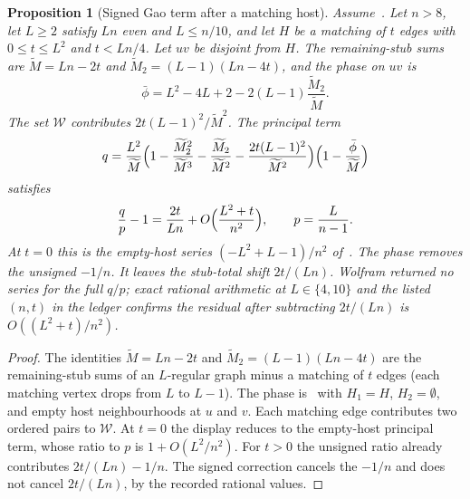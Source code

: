 \documentclass[11pt]{article}
\newtheorem{proposition}[theorem]{Proposition}
\begin{document}
\begin{proposition}[Signed Gao term after a matching host]
\label{prop:signed-matching-host}
Assume~\cite[Theorem~6]{Gao20}. Let \(n>8\), let \(L\ge 2\) satisfy
\(Ln\) even and \(L\le n/10\), and let \(H\) be a matching of \(t\) edges
with \(0\le t\le L^2\) and \(t<Ln/4\).
Let \(uv\) be disjoint from \(H\).
The remaining-stub sums are \(\widetilde M=Ln-2t\) and
\(\widetilde M_2=(L-1)(Ln-4t)\), and the phase on \(uv\) is
\[
\bar\phi=L^2-4L+2-2(L-1)\frac{\widetilde M_2}{\widetilde M}.
\]
The set \(\mathcal W\) contributes \(2t(L-1)^2/\widetilde M^2\).
The principal term
\[
q
=
\frac{L^2}{\widetilde M}
\Bigl(1-\frac{\widetilde M_2^2}{\widetilde M^3}-\frac{\widetilde M_2}{\widetilde M^2}-\frac{2t(L-1)^2}{\widetilde M^2}\Bigr)
\Bigl(1-\frac{\bar\phi}{\widetilde M}\Bigr)
\]
satisfies
\[
\frac{q}{p}-1
=
\frac{2t}{Ln}+O\Bigl(\frac{L^2+t}{n^2}\Bigr),
\qquad
p=\frac{L}{n-1}.
\]
At \(t=0\) this is the empty-host series \((-L^2+L-1)/n^2\) of~\cite{PlusOneV1}.
The phase removes the unsigned \(-1/n\).
It leaves the stub-total shift \(2t/(Ln)\).
Wolfram returned no series for the full \(q/p\); exact rational arithmetic
at \(L\in\{4,10\}\) and the listed \((n,t)\) in the ledger confirms the
residual after subtracting \(2t/(Ln)\) is \(O((L^2+t)/n^2)\).
\end{proposition}

\begin{proof}
The identities \(\widetilde M=Ln-2t\) and
\(\widetilde M_2=(L-1)(Ln-4t)\) are the remaining-stub sums of an
\(L\)-regular graph minus a matching of \(t\) edges (each matching vertex
drops from \(L\) to \(L-1\)).
The phase is~\cite[Theorem~6]{Gao20} with \(H_1=H\), \(H_2=\emptyset\),
and empty host neighbourhoods at \(u\) and \(v\).
Each matching edge contributes two ordered pairs to \(\mathcal W\).
At \(t=0\) the display reduces to the empty-host principal term, whose
ratio to \(p\) is \(1+O(L^2/n^2)\).
For \(t>0\) the unsigned ratio already contributes \(2t/(Ln)-1/n\).
The signed correction cancels the \(-1/n\) and does not cancel
\(2t/(Ln)\), by the recorded rational values.
\end{proof}
\end{document}
